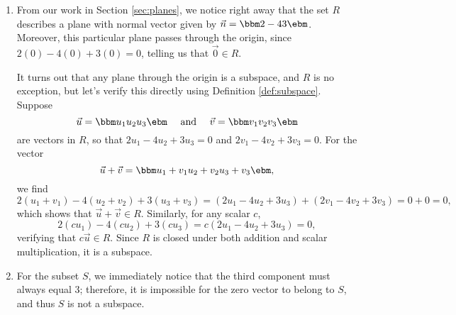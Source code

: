 {\begin{enumerate}
\item From our work in Section \ref{sec:planes}, we notice right away that the set $R$ describes a plane with normal vector given by $\vec n = \bbm 2\\-4\\3\ebm$. Moreover, this particular plane passes through the origin, since $2(0)-4(0)+3(0)=0$, telling us that $\vec 0 \in R$.

It turns out that any plane through the origin is a subspace, and $R$ is no exception, but let's verify this directly using Definition \ref{def:subspace}. Suppose 
\[
\vec u = \bbm u_1\\u_2\\u_3\ebm \quad \text{ and } \quad \vec v = \bbm v_1\\v_2\\v_3\ebm
\]
are vectors in $R$, so that $2u_1-4u_2+3u_3=0$ and $2v_1-4v_2+3v_3=0$. For the vector
\[
\vec u + \vec v = \bbm u_1+v_1\\u_2+v_2\\u_3+v_3\ebm,
\]
we find
\[
2(u_1+v_1)-4(u_2+v_2)+3(u_3+v_3) = (2u_1-4u_2+3u_3) + (2v_1-4v_2+3v_3) = 0 + 0 = 0,
\]
which shows that $\vec u+\vec v\in R$. Similarly, for any scalar $c$,
\[
2(cu_1)-4(cu_2)+3(cu_3) = c(2u_1-4u_2+3u_3) = 0,
\]
verifying that $c\vec u \in R$. Since $R$ is closed under both addition and scalar multiplication, it is a subspace.

\item For the subset $S$, we immediately notice that the third component must always equal 3; therefore, it is impossible for the zero vector to belong to $S$, and thus $S$ is not a subspace.
\end{enumerate}}

